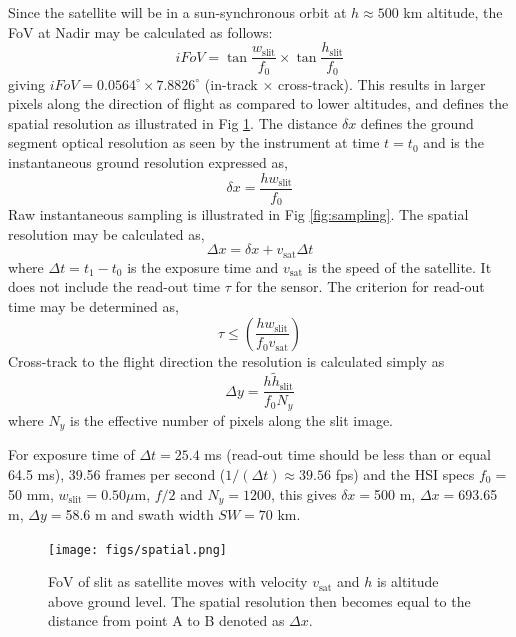 Since the satellite will be in a sun-synchronous orbit at $h\approx 500$ km altitude, the FoV at Nadir may be calculated as follows:
\begin{equation}
iFoV = \tan{\frac{w_{\text{slit}}}{f_0}} \times \tan{\frac{h_{\text{slit}}}{f_0}}
\end{equation}
giving $iFoV=0.0564^{\circ} \times 7.8826^{\circ}$ (in-track $\times$ cross-track). This results in larger pixels along the direction of flight as compared to lower altitudes, and defines the spatial resolution as illustrated in Fig \ref{fig:spatial}. The distance $\delta x$ defines the ground segment optical resolution as seen by the instrument at time $t = t_0$ and is the instantaneous ground resolution expressed as,
\begin{equation}
\delta x = \frac{h w_{\text{slit}}}{f_0}
\end{equation}
Raw instantaneous sampling is illustrated in Fig \ref{fig:sampling}. The spatial resolution may be calculated as,
\begin{equation}
\Delta x = \delta x + v_{\text{sat}} \Delta t \label{eq:spatial}
\end{equation}
where $\Delta t=t_1-t_0$ is the exposure time and $v_{\text{sat}}$ is the speed of the satellite. It does not include the read-out time $\tau$ for the sensor. The criterion for read-out time may be determined as,
\begin{equation}
\tau \leq \left( \frac{h w_{\text{slit}}}{f_0 v_{\text{sat}}}\right)
\end{equation}
Cross-track to the flight direction the resolution is calculated simply as
\begin{equation}
\Delta y = \frac{h \tilde{h}_{\text{slit}}}{f_0 N_y}
\end{equation}
where $N_y$ is the effective number of pixels along the slit image.

For exposure time of $\Delta t = 25.4$ ms (read-out time should be less than or equal 64.5 ms), 39.56 frames per second ($1/(\Delta t) \approx 39.56$ fps) and the HSI specs $f_0=$50 mm, $w_{\text{slit}}=0.50 \mu$m, $f/2$ and $N_{y}=1200$, this gives $\delta x =$500 m, $\Delta x =$693.65 m, $\Delta y =$58.6 m and swath width $SW=70$ km.

\begin{figure}[htbp]
  \centering
      \texttt{[image: figs/spatial.png]}
  \caption{FoV of slit as satellite moves with velocity $v_{\text{sat}}$ and $h$ is altitude above ground level. The spatial resolution then becomes equal to the distance from point A to B denoted as $\Delta x$.}
	\label{fig:spatial}
\end{figure}

